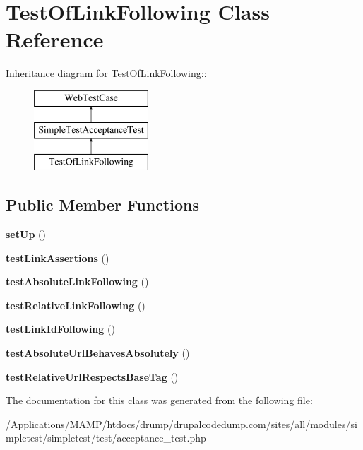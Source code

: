 \hypertarget{class_test_of_link_following}{
\section{TestOfLinkFollowing Class Reference}
\label{class_test_of_link_following}
}
Inheritance diagram for TestOfLinkFollowing::\begin{figure}[H]
\begin{center}
\leavevmode
\includegraphics[height=3cm]{class_test_of_link_following}
\end{center}
\end{figure}
\subsection*{Public Member Functions}
\begin{DoxyCompactItemize}
\item 
\hypertarget{class_test_of_link_following_a0a48593cbecbda12e39fb8df90955f2e}{
{\bfseries setUp} ()}
\label{class_test_of_link_following_a0a48593cbecbda12e39fb8df90955f2e}

\item 
\hypertarget{class_test_of_link_following_abe540b42463a2129dfaae9da3a8d8583}{
{\bfseries testLinkAssertions} ()}
\label{class_test_of_link_following_abe540b42463a2129dfaae9da3a8d8583}

\item 
\hypertarget{class_test_of_link_following_a02a97061cdb3c3446f169e0c6fb672f4}{
{\bfseries testAbsoluteLinkFollowing} ()}
\label{class_test_of_link_following_a02a97061cdb3c3446f169e0c6fb672f4}

\item 
\hypertarget{class_test_of_link_following_aa9b17d0ddabb2d151ef6b10185192007}{
{\bfseries testRelativeLinkFollowing} ()}
\label{class_test_of_link_following_aa9b17d0ddabb2d151ef6b10185192007}

\item 
\hypertarget{class_test_of_link_following_a91737601ec7aff156f2b6363b975c28e}{
{\bfseries testLinkIdFollowing} ()}
\label{class_test_of_link_following_a91737601ec7aff156f2b6363b975c28e}

\item 
\hypertarget{class_test_of_link_following_a207052d7e77b09db8e2e93acb974f113}{
{\bfseries testAbsoluteUrlBehavesAbsolutely} ()}
\label{class_test_of_link_following_a207052d7e77b09db8e2e93acb974f113}

\item 
\hypertarget{class_test_of_link_following_ac750007568a3097fc337d598e7ee86fb}{
{\bfseries testRelativeUrlRespectsBaseTag} ()}
\label{class_test_of_link_following_ac750007568a3097fc337d598e7ee86fb}

\end{DoxyCompactItemize}


The documentation for this class was generated from the following file:\begin{DoxyCompactItemize}
\item 
/Applications/MAMP/htdocs/drump/drupalcodedump.com/sites/all/modules/simpletest/simpletest/test/acceptance\_\-test.php\end{DoxyCompactItemize}
